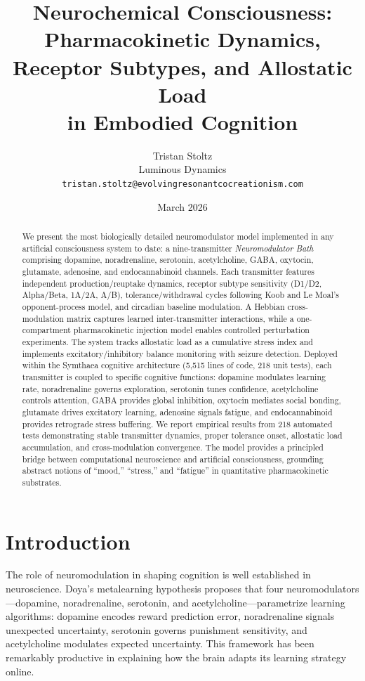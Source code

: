 \documentclass[11pt,a4paper]{article}
\title{Neurochemical Consciousness: Pharmacokinetic Dynamics,\\Receptor Subtypes, and Allostatic Load\\in Embodied Cognition}
\author{
  Tristan Stoltz \\
  Luminous Dynamics \\
  \texttt{tristan.stoltz@evolvingresonantcocreationism.com}
}
\date{March 2026}
\begin{document}
\maketitle

\begin{abstract}
We present the most biologically detailed neuromodulator model implemented in any artificial consciousness system to date: a nine-transmitter \emph{Neuromodulator Bath} comprising dopamine, noradrenaline, serotonin, acetylcholine, GABA, oxytocin, glutamate, adenosine, and endocannabinoid channels. Each transmitter features independent production/reuptake dynamics, receptor subtype sensitivity (D1/D2, Alpha/Beta, 1A/2A, A/B), tolerance/withdrawal cycles following Koob and Le Moal's opponent-process model, and circadian baseline modulation. A Hebbian cross-modulation matrix captures learned inter-transmitter interactions, while a one-compartment pharmacokinetic injection model enables controlled perturbation experiments. The system tracks allostatic load as a cumulative stress index and implements excitatory/inhibitory balance monitoring with seizure detection. Deployed within the Symthaea cognitive architecture (5,515 lines of code, 218 unit tests), each transmitter is coupled to specific cognitive functions: dopamine modulates learning rate, noradrenaline governs exploration, serotonin tunes confidence, acetylcholine controls attention, GABA provides global inhibition, oxytocin mediates social bonding, glutamate drives excitatory learning, adenosine signals fatigue, and endocannabinoid provides retrograde stress buffering. We report empirical results from 218 automated tests demonstrating stable transmitter dynamics, proper tolerance onset, allostatic load accumulation, and cross-modulation convergence. The model provides a principled bridge between computational neuroscience and artificial consciousness, grounding abstract notions of ``mood,'' ``stress,'' and ``fatigue'' in quantitative pharmacokinetic substrates.
\end{abstract}

\section{Introduction}

The role of neuromodulation in shaping cognition is well established in neuroscience. Doya's metalearning hypothesis \citep{doya2002} proposes that four neuromodulators---dopamine, noradrenaline, serotonin, and acetylcholine---parametrize learning algorithms: dopamine encodes reward prediction error, noradrenaline signals unexpected uncertainty, serotonin governs punishment sensitivity, and acetylcholine modulates expected uncertainty. This framework has been remarkably productive in explaining how the brain adapts its learning strategy online.
\end{document}

